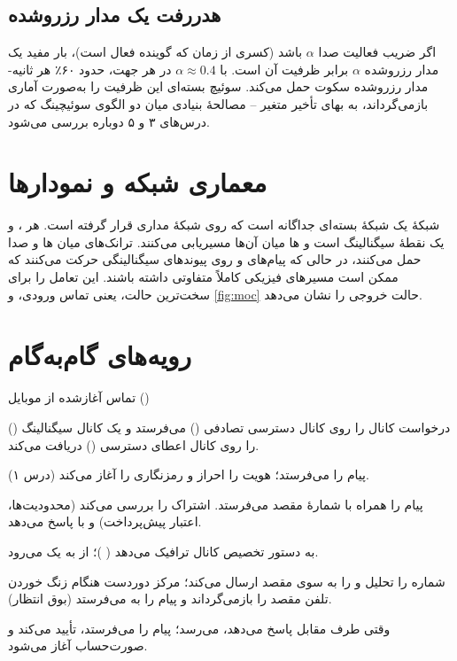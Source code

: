 \documentclass[11pt,a4paper]{article}
\begin{document}
\subsection{هدررفت یک مدار رزروشده}
اگر ضریب فعالیت صدا $\alpha$ باشد (کسری از زمان که گوینده فعال است)، بار مفید یک مدار رزروشده
$\alpha$ برابر ظرفیت آن است. با $\alpha\approx0.4$ در هر جهت، حدود ۶۰٪ هر ثانیه-مدار رزروشده
سکوت حمل می‌کند. سوئیچ بسته‌ای این ظرفیت را به‌صورت آماری بازمی‌گرداند، به بهای تأخیر متغیر --
مصالحهٔ بنیادی میان دو الگوی سوئیچینگ که در درس‌های ۳ و ۵ دوباره بررسی می‌شود.

\section{معماری شبکه و نمودارها}
شبکهٔ  یک شبکهٔ بسته‌ای جداگانه است که روی شبکهٔ مداری قرار گرفته است. هر ،
 و  یک نقطهٔ سیگنالینگ است و ها میان آن‌ها مسیریابی می‌کنند.
ترانک‌های میان ها و  صدا حمل می‌کنند، در حالی که پیام‌های  و
 روی پیوندهای سیگنالینگی حرکت می‌کنند که ممکن است مسیرهای فیزیکی کاملاً متفاوتی
داشته باشند.  این تعامل را برای سخت‌ترین حالت، یعنی تماس ورودی، و \cref{fig:moc}
حالت خروجی را نشان می‌دهد.

\section{رویه‌های گام‌به‌گام}

\begin{procedurebox}{تماس آغازشده از موبایل ()}\label{proc:moc}
\begin{steps}
  \item {} درخواست کانال را روی کانال دسترسی تصادفی () می‌فرستد و یک کانال
        سیگنالینگ () را روی کانال اعطای دسترسی () دریافت می‌کند.
  \item پیام  را می‌فرستد؛  هویت  را احراز و
        رمزنگاری را آغاز می‌کند (درس ۱).
  \item {} پیام  را همراه با شمارهٔ مقصد می‌فرستد.  اشتراک را بررسی
        می‌کند (محدودیت‌ها، اعتبار پیش‌پرداخت) و با  پاسخ می‌دهد.
  \item {} به  دستور تخصیص کانال ترافیک می‌دهد (
        )؛  از  به یک  می‌رود.
  \item {} شماره را تحلیل و   را به سوی مقصد ارسال می‌کند؛ مرکز
        دوردست هنگام زنگ خوردن تلفن مقصد  را بازمی‌گرداند و  پیام
         را به  می‌فرستد (بوق انتظار).
  \item وقتی طرف مقابل پاسخ می‌دهد،   می‌رسد؛  پیام 
        را می‌فرستد،  تأیید می‌کند و صورت‌حساب آغاز می‌شود.
\end{steps}
\end{procedurebox}
\end{document}

